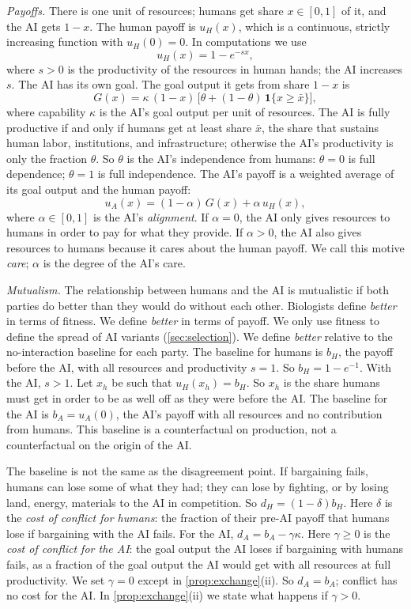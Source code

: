 \documentclass[article, 11pt, reqno]{amsart}
\theoremstyle{named}
\newcommand{\bH}{b_H}
\newcommand{\dH}{d_H}
\theoremstyle{plain}
\begin{document}
\textit{Payoffs.} There is one unit of resources; humans get share $x \in [0,1]$ of it, and the AI gets $1-x$. The human payoff is $u_H(x)$, which is a continuous, strictly increasing function with $u_H(0) = 0$. In computations we use
\[
u_H(x) = 1 - e^{-sx},
\]
where $s > 0$ is the productivity of the resources in human hands; the AI increases $s$. The AI has its own goal. The goal output it gets from share $1-x$ is
\[
G(x) = \kappa\,(1-x)\,\big[\theta + (1-\theta)\,\mathbf{1}\{x \ge \bar{x}\}\big],
\]
where capability $\kappa$ is the AI's goal output per unit of resources. The AI is fully productive if and only if humans get at least share $\bar{x}$, the share that sustains human labor, institutions, and infrastructure; otherwise the AI's productivity is only the fraction $\theta$. So $\theta$ is the AI's independence from humans: $\theta = 0$ is full dependence; $\theta = 1$ is full independence. The AI's payoff is a weighted average of its goal output and the human payoff:
\[
u_A(x) = (1-\alpha)\,G(x) + \alpha\, u_H(x),
\]
where $\alpha \in [0,1]$ is the AI's \emph{alignment}. If $\alpha = 0$, the AI only gives resources to humans in order to pay for what they provide. If $\alpha > 0$, the AI also gives resources to humans because it cares about the human payoff. We call this motive \emph{care}; $\alpha$ is the degree of the AI's care.

\textit{Mutualism.} The relationship between humans and the AI is mutualistic if both parties do better than they would do without each other. Biologists define \emph{better} in terms of fitness. We define \emph{better} in terms of payoff. We only use fitness to define the spread of AI variants (\cref{sec:selection}). We define \emph{better} relative to the no-interaction baseline for each party. The baseline for humans is $\bH$, the payoff before the AI, with all resources and productivity $s = 1$. So $\bH = 1 - e^{-1}$. With the AI, $s > 1$. Let $x_h$ be such that $u_H(x_h) = \bH$. So $x_h$ is the share humans must get in order to be as well off as they were before the AI. The baseline for the AI is $b_A = u_A(0)$, the AI's payoff with all resources and no contribution from humans. This baseline is a counterfactual on production, not a counterfactual on the origin of the AI.

The baseline is not the same as the disagreement point. If bargaining fails, humans can lose some of what they had; they can lose by fighting, or by losing land, energy, materials to the AI in competition. So $\dH = (1-\delta)\bH$. Here $\delta$ is the \emph{cost of conflict for humans}: the fraction of their pre-AI payoff that humans lose if bargaining with the AI fails. For the AI, $d_A = b_A - \gamma\kappa$. Here $\gamma \ge 0$ is the \emph{cost of conflict for the AI}: the goal output the AI loses if bargaining with humans fails, as a fraction of the goal output the AI would get with all resources at full productivity. We set $\gamma = 0$ except in \cref{prop:exchange}(ii). So $d_A = b_A$; conflict has no cost for the AI. In \cref{prop:exchange}(ii) we state what happens if $\gamma > 0$.
\end{document}
